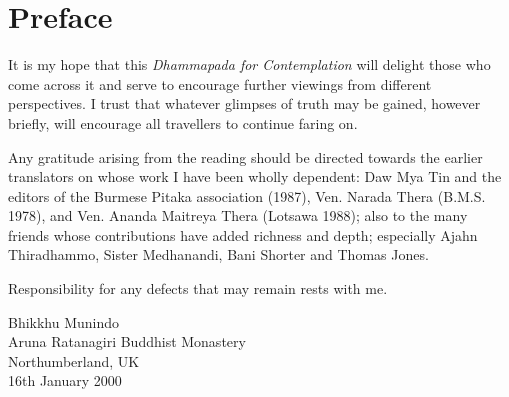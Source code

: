 

\chapter[Preface to the first edition (2000)]{Preface}

It is my hope that this \emph{Dhammapada for Contemplation }will delight those who come across it and serve to encourage further viewings from different perspectives. I trust that whatever glimpses of truth may be gained, however briefly, will encourage all travellers to continue faring on.

Any gratitude arising from the reading should be directed towards the earlier translators on whose work I have been wholly dependent: Daw Mya Tin and  the editors of the  Burmese Pitaka association (1987), Ven. Narada Thera (B.M.S. 1978), and Ven. Ananda Maitreya Thera  (Lotsawa 1988); also to the many friends whose contributions have added richness and depth; especially Ajahn Thiradhammo, Sister Medhanandi, Bani Shorter and Thomas Jones.

Responsibility for any defects that may remain rests with me.

{\raggedleft
Bhikkhu Munindo\\
Aruna Ratanagiri Buddhist Monastery\\
Northumberland, UK\\
16th January 2000
\par}

